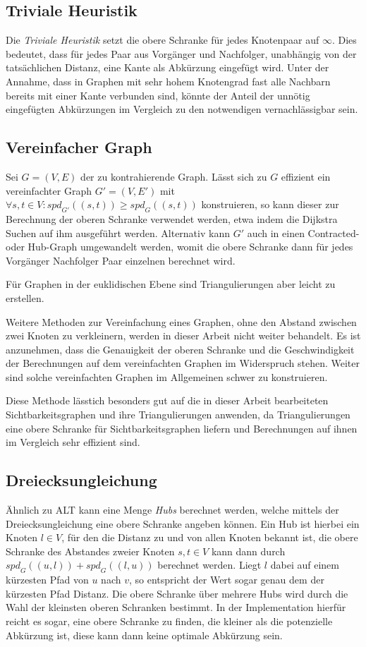 \subsection{Triviale Heuristik}
Die \emph{Triviale Heuristik} setzt die obere Schranke für jedes Knotenpaar auf $\infty$.
Dies bedeutet, dass für jedes Paar aus Vorgänger und Nachfolger, unabhängig von der tatsächlichen Distanz, eine Kante als Abkürzung eingefügt wird.
Unter der Annahme, dass in Graphen mit sehr hohem Knotengrad fast alle Nachbarn bereits mit einer Kante verbunden sind, könnte der Anteil der unnötig eingefügten Abkürzungen im Vergleich zu den notwendigen vernachlässigbar sein.

\subsection{Vereinfacher Graph}
Sei $G = (V, E)$ der zu kontrahierende Graph.
Lässt sich zu $G$ effizient ein vereinfachter Graph $G' = (V, E')$ mit $\forall s, t \in V \colon {spd}_{G'} ((s, t)) \geq {spd}_{G} ((s, t))$ konstruieren, so kann dieser zur Berechnung der oberen Schranke verwendet werden, etwa indem die Dijkstra Suchen auf ihm ausgeführt werden.
Alternativ kann $G'$ auch in einen Contracted- oder Hub-Graph umgewandelt werden, womit die obere Schranke dann für jedes Vorgänger Nachfolger Paar einzelnen berechnet wird.

Für Graphen in der euklidischen Ebene sind Triangulierungen aber leicht zu erstellen.

Weitere Methoden zur Vereinfachung eines Graphen, ohne den Abstand zwischen zwei Knoten zu verkleinern, werden in dieser Arbeit nicht weiter behandelt.
Es ist anzunehmen, dass die Genauigkeit der oberen Schranke und die Geschwindigkeit der Berechnungen auf dem vereinfachten Graphen im Widerspruch stehen.
Weiter sind solche vereinfachten Graphen im Allgemeinen schwer zu konstruieren.

Diese Methode lässtich besonders gut auf die in dieser Arbeit bearbeiteten Sichtbarkeitsgraphen und ihre Triangulierungen anwenden, da Triangulierungen eine obere Schranke für Sichtbarkeitsgraphen liefern und Berechnungen auf ihnen im Vergleich sehr effizient sind.

\subsection{Dreiecksungleichung}
Ähnlich zu ALT\cite{goldberg2005computing} kann eine Menge \emph{Hubs} berechnet werden, welche mittels der Dreiecksungleichung eine obere Schranke angeben können.
Ein Hub ist hierbei ein Knoten $l \in V$, für den die Distanz zu und von allen Knoten bekannt ist, die obere Schranke des Abstandes zweier Knoten $s, t \in V$ kann dann durch ${spd}_G ((u, l)) + {spd}_G ((l, u))$ berechnet werden.
Liegt $l$ dabei auf einem kürzesten Pfad von $u$ nach $v$, so entspricht der Wert sogar genau dem der kürzesten Pfad Distanz.
Die obere Schranke über mehrere Hubs wird durch die Wahl der kleinsten oberen Schranken bestimmt.
In der Implementation hierfür reicht es sogar, eine obere Schranke zu finden, die kleiner als die potenzielle Abkürzung ist, diese kann dann keine optimale Abkürzung sein.

